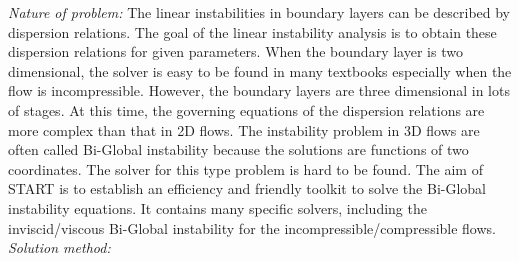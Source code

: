 \documentclass[preprint,12pt]{elsarticle}
\begin{document}
\begin{small}
{\em Nature of problem:}
The linear instabilities in boundary layers can be described by dispersion relations. The goal of the linear instability analysis is to obtain these dispersion relations for given parameters. When the boundary layer is two dimensional, the solver is easy to be found in many textbooks especially when the flow is incompressible. However, the boundary layers are three dimensional in lots of stages. At this time, the governing equations of the dispersion relations are more complex than that in 2D flows. The instability problem in 3D flows are often called Bi-Global instability because the solutions are functions of two coordinates. The solver for this type problem is hard to be found. The aim of START is to establish an efficiency and friendly toolkit to solve the Bi-Global instability equations. It contains many specific solvers, including the inviscid/viscous Bi-Global instability for the incompressible/compressible flows.
   \\
{\em Solution method:}\\
   \\
   \\
   \\
   \\


\end{small}
\end{document}
